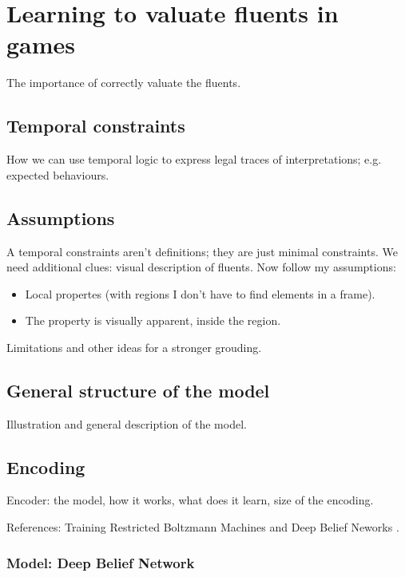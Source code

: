\chapter{Learning to valuate fluents in games}

The importance of correctly valuate the fluents.

\section{Temporal constraints}

How we can use temporal logic to express legal traces of interpretations;
e.g. expected behaviours.

\section{Assumptions}

A temporal constraints aren't definitions; they are just minimal constraints.
We need additional clues: visual description of fluents.
Now follow my assumptions:
\begin{itemize}
	\item Local propertes (with regions I don't have to find elements in a
		frame).
	\item The property is visually apparent, inside the region.
\end{itemize}

Limitations and other ideas for a stronger grouding.

\section{General structure of the model}

Illustration and general description of the model.

\section{Encoding}

Encoder: the model, how it works, what does it learn, size of the encoding.

References:
Training Restricted Boltzmann Machines and Deep Belief Neworks
\cite{bib:rbm-training}\cite{bib:ml-book-murphy}.

\subsection{Model: Deep Belief Network}

